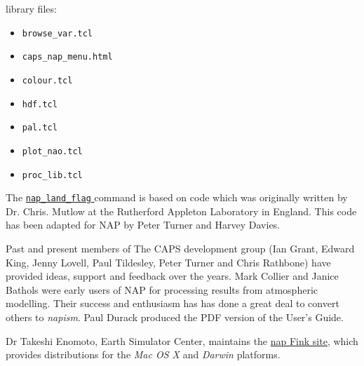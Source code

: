   library files:
  \begin{itemize}
    \item 
      \texttt{browse\_var.tcl}
    \item 
      \texttt{caps\_nap\_menu.html}
    \item 
      \texttt{colour.tcl}
    \item 
      \texttt{hdf.tcl}
    \item 
      \texttt{pal.tcl}
    \item 
      \texttt{plot\_nao.tcl}
    \item 
      \texttt{proc\_lib.tcl}
  \end{itemize}
  \par The 
  \href{land-flag.html}{ \texttt{nap\_land\_flag} } command is based on code which was originally written by Dr.
  Chris. Mutlow at the Rutherford Appleton Laboratory in England. This
  code has been adapted for NAP by Peter Turner and Harvey Davies.
  \par Past and present members of The CAPS development group (Ian Grant,
  Edward King, Jenny Lovell, Paul Tildesley, Peter Turner and Chris
  Rathbone) have provided ideas, support and feedback over the years.
  Mark Collier and Janice Bathols were early users of NAP for
  processing results from atmospheric modelling. Their success and
  enthusiasm has has done a great deal to convert others to 
  \textit{napism}. Paul Durack produced the PDF version of the
  User's Guide.
  \par Dr Takeshi Enomoto, Earth Simulator Center, maintains the 
  \href{http://fink.sourceforge.net/pdb/package.php/nap}{nap Fink site}, which provides distributions for the 
  \textit{Mac OS X} and 
  \textit{Darwin} platforms.
